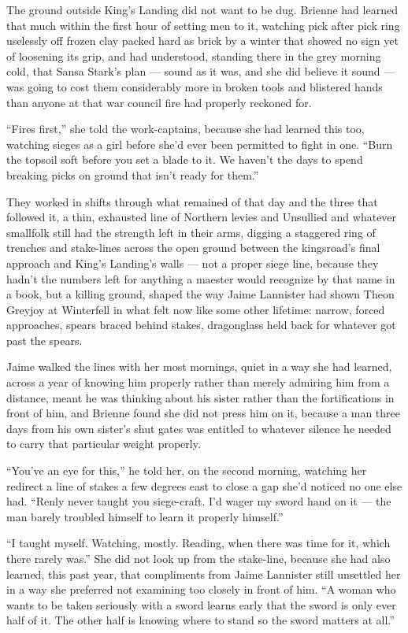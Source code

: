 The ground outside King’s Landing did not want to be dug. Brienne had learned that much within the first hour of setting men to it, watching pick after pick ring uselessly off frozen clay packed hard as brick by a winter that showed no sign yet of loosening its grip, and had understood, standing there in the grey morning cold, that Sansa Stark’s plan — sound as it was, and she did believe it sound — was going to cost them considerably more in broken tools and blistered hands than anyone at that war council fire had properly reckoned for.

“Fires first,” she told the work-captains, because she had learned this too, watching sieges as a girl before she’d ever been permitted to fight in one. “Burn the topsoil soft before you set a blade to it. We haven’t the days to spend breaking picks on ground that isn’t ready for them.”

They worked in shifts through what remained of that day and the three that followed it, a thin, exhausted line of Northern levies and Unsullied and whatever smallfolk still had the strength left in their arms, digging a staggered ring of trenches and stake-lines across the open ground between the kingsroad’s final approach and King’s Landing’s walls — not a proper siege line, because they hadn’t the numbers left for anything a maester would recognize by that name in a book, but a killing ground, shaped the way Jaime Lannister had shown Theon Greyjoy at Winterfell in what felt now like some other lifetime: narrow, forced approaches, spears braced behind stakes, dragonglass held back for whatever got past the spears.

Jaime walked the lines with her most mornings, quiet in a way she had learned, across a year of knowing him properly rather than merely admiring him from a distance, meant he was thinking about his sister rather than the fortifications in front of him, and Brienne found she did not press him on it, because a man three days from his own sister’s shut gates was entitled to whatever silence he needed to carry that particular weight properly.

“You’ve an eye for this,” he told her, on the second morning, watching her redirect a line of stakes a few degrees east to close a gap she’d noticed no one else had. “Renly never taught you siege-craft. I’d wager my sword hand on it — the man barely troubled himself to learn it properly himself.”

“I taught myself. Watching, mostly. Reading, when there was time for it, which there rarely was.” She did not look up from the stake-line, because she had also learned, this past year, that compliments from Jaime Lannister still unsettled her in a way she preferred not examining too closely in front of him. “A woman who wants to be taken seriously with a sword learns early that the sword is only ever half of it. The other half is knowing where to stand so the sword matters at all.”

